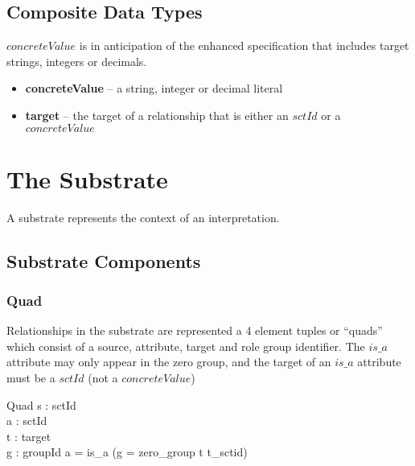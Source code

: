 \documentclass{article}
\begin{document}
\subsection{Composite Data Types}
$concreteValue$ is in anticipation of the enhanced specification that includes target strings, integers or decimals.

\begin{itemize}[noitemsep,nolistsep]
\item \textbf{concreteValue} -- a string, integer or decimal literal
\item \textbf{target} -- the target of a relationship that is either an $sctId$ or a $concreteValue$
\end{itemize}

\pagebreak
\section{The Substrate}
A substrate represents the context of an interpretation.  
\subsection{Substrate Components}
\subsubsection{Quad}
Relationships in the substrate are represented a 4 element tuples or ``quads'' which consist of a source, attribute, target and role group identifier.  The $is\_a$ attribute may
only appear in the zero group, and the target of an $is\_a$ attribute must be a $sctId$ (not a $concreteValue$)

\begin{schema}{Quad}
   s : sctId \\
   a : sctId \\
   t : target \\
   g : groupId
\where
   a = is\_a \implies (g = zero\_group \land t \in \ran t\_sctid)
\end{schema}
\end{document}
